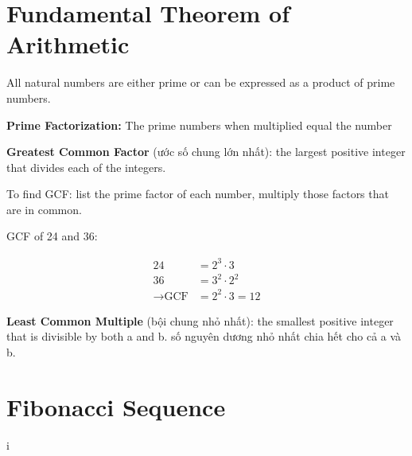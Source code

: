 \section{Fundamental Theorem of Arithmetic}

All natural numbers are either prime or can be expressed as a product of prime numbers.

\textbf{Prime Factorization:} The prime numbers when multiplied equal the number

\vspace{10 mm}

\textbf{Greatest Common Factor} (ước số chung lớn nhất): the largest positive integer that divides each of the integers.

To find GCF: list the prime factor of each number, multiply those factors that are in common.

GCF of 24 and 36:

\[
  \begin{aligned}
    24 &= 2^{3} \cdot 3\\
    36 &= 3^{2} \cdot 2^{2}\\
    \rightarrow \text{GCF} &= 2^{2} \cdot 3 = 12
  \end{aligned}\]
\[\]

\textbf{Least Common Multiple} (bội chung nhỏ nhất): the smallest positive integer that is divisible by both a and b. số nguyên dương nhỏ nhất chia hết cho cả a và b.

\section{Fibonacci Sequence}

i

